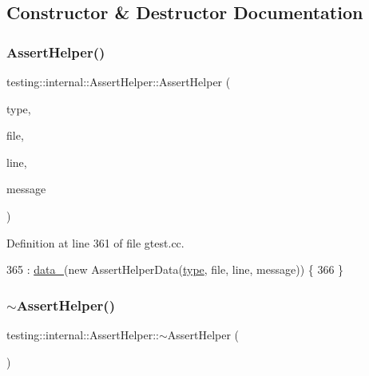 \subsection{Constructor \& Destructor Documentation}
\mbox{\label{classtesting_1_1internal_1_1AssertHelper_ac2c9334518fd4087189b4505567a3c90}} 
\subsubsection{\texorpdfstring{Assert\+Helper()}{AssertHelper()}}
{\footnotesize\ttfamily testing\+::internal\+::\+Assert\+Helper\+::\+Assert\+Helper (\begin{DoxyParamCaption}\item[{\hyperlink{classtesting_1_1TestPartResult_a65ae656b33fdfdfffaf34858778a52d5}{Test\+Part\+Result\+::\+Type}}]{type,  }\item[{const char $\ast$}]{file,  }\item[{int}]{line,  }\item[{const char $\ast$}]{message }\end{DoxyParamCaption})}



Definition at line 361 of file gtest.\+cc.


\begin{DoxyCode}
365     : \hyperlink{classtesting_1_1internal_1_1AssertHelper_af69a4d66a929d0c6e419f4efd3ba6b3a}{data\_}(\textcolor{keyword}{new} AssertHelperData(\hyperlink{namespacegenerate__debs_a50bc9a7ecac9584553e089a448bcde58}{type}, file, line, message)) \{
366 \}
\end{DoxyCode}
\mbox{\label{classtesting_1_1internal_1_1AssertHelper_a51c640785d4ed4a0155cc9aa857d8931}} 
\subsubsection{\texorpdfstring{$\sim$\+Assert\+Helper()}{~AssertHelper()}}
{\footnotesize\ttfamily testing\+::internal\+::\+Assert\+Helper\+::$\sim$\+Assert\+Helper (\begin{DoxyParamCaption}{ }\end{DoxyParamCaption})}



